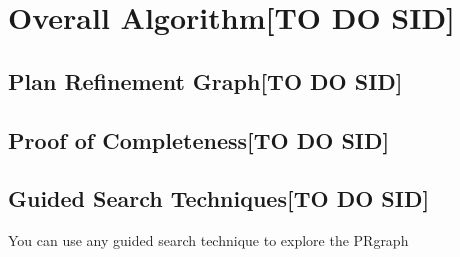 \section{Overall Algorithm[TO DO SID]}


\subsection{Plan Refinement Graph[TO DO SID]}


\subsection{Proof of Completeness[TO DO SID]}


\subsection{Guided Search Techniques[TO DO SID]}
You can use any guided search technique to explore the PRgraph